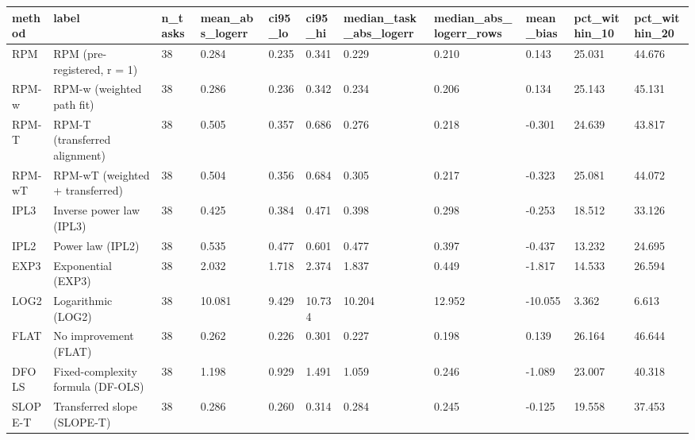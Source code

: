 \begin{tabular}{lllllllllll}
\hline
method & label & n\_tasks & mean\_abs\_logerr & ci95\_lo & ci95\_hi & median\_task\_abs\_logerr & median\_abs\_logerr\_rows & mean\_bias & pct\_within\_10 & pct\_within\_20 \\
\hline
RPM & RPM (pre-registered, r = 1) & 38 & 0.284 & 0.235 & 0.341 & 0.229 & 0.210 & 0.143 & 25.031 & 44.676 \\
RPM-w & RPM-w (weighted path fit) & 38 & 0.286 & 0.236 & 0.342 & 0.234 & 0.206 & 0.134 & 25.143 & 45.131 \\
RPM-T & RPM-T (transferred alignment) & 38 & 0.505 & 0.357 & 0.686 & 0.276 & 0.218 & -0.301 & 24.639 & 43.817 \\
RPM-wT & RPM-wT (weighted + transferred) & 38 & 0.504 & 0.356 & 0.684 & 0.305 & 0.217 & -0.323 & 25.081 & 44.072 \\
IPL3 & Inverse power law (IPL3) & 38 & 0.425 & 0.384 & 0.471 & 0.398 & 0.298 & -0.253 & 18.512 & 33.126 \\
IPL2 & Power law (IPL2) & 38 & 0.535 & 0.477 & 0.601 & 0.477 & 0.397 & -0.437 & 13.232 & 24.695 \\
EXP3 & Exponential (EXP3) & 38 & 2.032 & 1.718 & 2.374 & 1.837 & 0.449 & -1.817 & 14.533 & 26.594 \\
LOG2 & Logarithmic (LOG2) & 38 & 10.081 & 9.429 & 10.734 & 10.204 & 12.952 & -10.055 & 3.362 & 6.613 \\
FLAT & No improvement (FLAT) & 38 & 0.262 & 0.226 & 0.301 & 0.227 & 0.198 & 0.139 & 26.164 & 46.644 \\
DFOLS & Fixed-complexity formula (DF-OLS) & 38 & 1.198 & 0.929 & 1.491 & 1.059 & 0.246 & -1.089 & 23.007 & 40.318 \\
SLOPE-T & Transferred slope (SLOPE-T) & 38 & 0.286 & 0.260 & 0.314 & 0.284 & 0.245 & -0.125 & 19.558 & 37.453 \\
\hline
\end{tabular}
